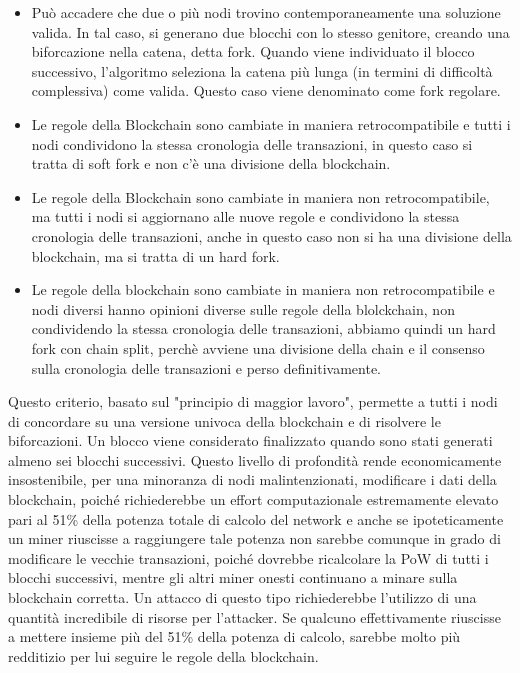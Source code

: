 \begin{itemize}
\item Può accadere che due o più nodi trovino contemporaneamente una soluzione valida. In tal caso, si generano due blocchi con lo stesso genitore, creando una biforcazione nella catena, detta fork. Quando viene individuato il blocco successivo, l’algoritmo seleziona la catena più lunga (in termini di difficoltà complessiva) come valida. Questo caso viene denominato come fork regolare.
\item Le regole della Blockchain sono cambiate in maniera retrocompatibile e tutti i nodi condividono la stessa cronologia delle transazioni, in questo caso si tratta di soft fork e non c’è una divisione della blockchain.
\item Le regole della Blockchain sono cambiate in maniera non retrocompatibile, ma tutti i nodi si aggiornano alle nuove regole e condividono la stessa cronologia delle transazioni, anche in questo caso non si ha una divisione della blockchain, ma si tratta di un hard fork.
\item Le regole della blockchain sono cambiate in maniera non retrocompatibile e nodi diversi hanno opinioni diverse sulle regole della blolckchain, non condividendo la stessa cronologia delle transazioni, abbiamo quindi un hard fork con chain split, perchè avviene una divisione della chain e il consenso sulla cronologia delle transazioni e perso definitivamente.
\end{itemize}
Questo criterio, basato sul "principio di maggior lavoro", permette a tutti i nodi di concordare su una versione univoca della blockchain e di risolvere le biforcazioni. Un blocco viene considerato finalizzato quando sono stati generati almeno sei blocchi successivi. Questo livello di profondità rende economicamente insostenibile, per una minoranza di nodi malintenzionati, modificare i dati della blockchain, poiché richiederebbe un effort computazionale estremamente elevato pari al 51\% della potenza totale di calcolo del network e anche se ipoteticamente un miner riuscisse a raggiungere tale potenza non sarebbe comunque in grado di modificare le vecchie transazioni, poiché dovrebbe ricalcolare la PoW di tutti i blocchi successivi, mentre gli altri miner onesti continuano a minare sulla blockchain corretta. Un attacco di questo tipo richiederebbe l’utilizzo di una quantità incredibile di risorse per l’attacker. Se qualcuno effettivamente riuscisse a mettere insieme più del 51\% della potenza di calcolo, sarebbe molto più redditizio per lui seguire le regole della blockchain.
